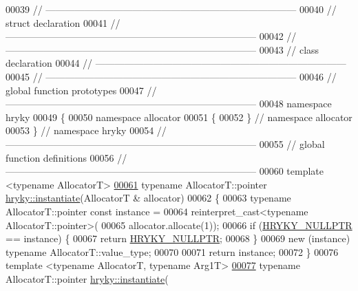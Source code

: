\begin{DoxyCode}
00039 \textcolor{comment}{//
      ------------------------------------------------------------------------------}
00040 \textcolor{comment}{// struct declaration}
00041 \textcolor{comment}{//
      ------------------------------------------------------------------------------}
00042 \textcolor{comment}{//
      ------------------------------------------------------------------------------}
00043 \textcolor{comment}{// class declaration}
00044 \textcolor{comment}{//
      ------------------------------------------------------------------------------}
00045 \textcolor{comment}{//
      ------------------------------------------------------------------------------}
00046 \textcolor{comment}{// global function prototypes}
00047 \textcolor{comment}{//
      ------------------------------------------------------------------------------}
00048 \textcolor{keyword}{namespace }hryky
00049 \{
00050 \textcolor{keyword}{namespace }allocator
00051 \{
00052 \} \textcolor{comment}{// namespace allocator}
00053 \} \textcolor{comment}{// namespace hryky}
00054 \textcolor{comment}{//
      ------------------------------------------------------------------------------}
00055 \textcolor{comment}{// global function definitions}
00056 \textcolor{comment}{//
      ------------------------------------------------------------------------------}
00060 \textcolor{comment}{}\textcolor{keyword}{template} <\textcolor{keyword}{typename} AllocatorT>
\hypertarget{allocator__common_8h_source_l00061}{}\hyperlink{namespacehryky_a7e731db6d90571cf1aea6e113d43b6ad}{00061} \textcolor{keyword}{typename} AllocatorT::pointer \hyperlink{namespacehryky_a7e731db6d90571cf1aea6e113d43b6ad}{hryky::instantiate}(AllocatorT & allocator)
00062 \{
00063     \textcolor{keyword}{typename} AllocatorT::pointer \textcolor{keyword}{const} instance =
00064         \textcolor{keyword}{reinterpret\_cast<}typename AllocatorT::pointer\textcolor{keyword}{>}(
00065             allocator.allocate(1));
00066     \textcolor{keywordflow}{if} (\hyperlink{common_8h_a4cd4ac09cfcdbd6b30ee69afc156e210}{HRYKY_NULLPTR} == instance) \{
00067         \textcolor{keywordflow}{return} \hyperlink{common_8h_a4cd4ac09cfcdbd6b30ee69afc156e210}{HRYKY_NULLPTR};
00068     \}
00069     \textcolor{keyword}{new} (instance) \textcolor{keyword}{typename} AllocatorT::value\_type;
00070     
00071     \textcolor{keywordflow}{return} instance;
00072 \}
00076 \textcolor{keyword}{template} <\textcolor{keyword}{typename} AllocatorT, \textcolor{keyword}{typename} Arg1T>
\hypertarget{allocator__common_8h_source_l00077}{}\hyperlink{namespacehryky_a02b5dc8e5806eb5545fa209d700b7f11}{00077} \textcolor{keyword}{typename} AllocatorT::pointer \hyperlink{namespacehryky_a7e731db6d90571cf1aea6e113d43b6ad}{hryky::instantiate}(

\end{DoxyCode}

